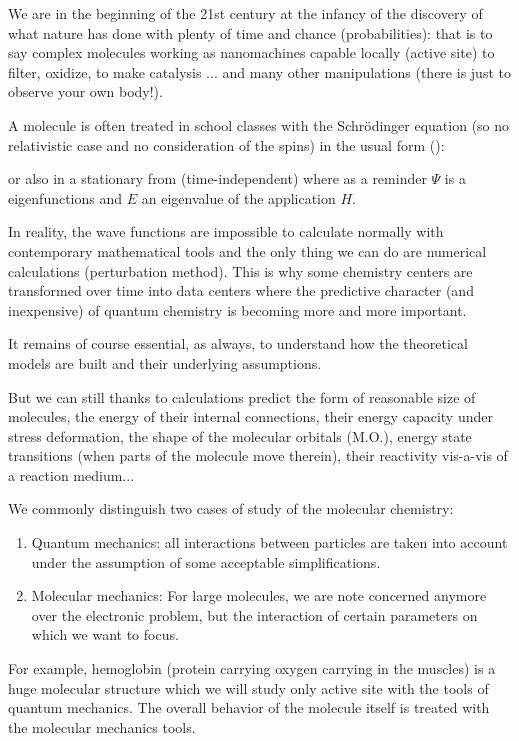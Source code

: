 	We are in the beginning of the 21st century at the infancy of the discovery of what nature has done with plenty of time and chance (probabilities): that is to say complex molecules working as nanomachines capable locally (active site) to filter, oxidize, to make catalysis ... and many other manipulations (there is just to observe your own body!).
	
	A molecule is often treated in school classes with the Schrödinger equation (so no relativistic case and no consideration of the spins) in the usual form ():
	
	or also in a stationary from (time-independent) where as a reminder $\Psi$ is a eigenfunctions and $E$ an eigenvalue of the application $H$.
	
	In reality, the wave functions are impossible to calculate normally with contemporary mathematical tools and the only thing we can do are numerical calculations (perturbation method). This is why some chemistry centers are transformed over time into data centers where the predictive character (and inexpensive) of quantum chemistry is becoming more and more important.
	
	It remains of course essential, as always, to understand how the theoretical models are built and their underlying assumptions.
	
	But we can still thanks to calculations predict the form of reasonable size of molecules, the energy of their internal connections, their energy capacity under stress deformation, the shape of the molecular orbitals (M.O.), energy state transitions (when parts of the molecule move therein), their reactivity vis-a-vis of a reaction medium...
	
	We commonly distinguish two cases of study of the molecular chemistry:
	\begin{enumerate}
		\item Quantum mechanics: all interactions between particles are taken into account under the assumption of some acceptable simplifications.
		\item Molecular mechanics: For large molecules, we are note concerned anymore over the electronic problem, but the interaction of certain parameters on which we want to focus.
	\end{enumerate}
	For example, hemoglobin (protein carrying oxygen carrying in the muscles) is a huge molecular structure which we will study only active site with the tools of quantum mechanics. The overall behavior of the molecule itself is treated with the molecular mechanics tools.
	
